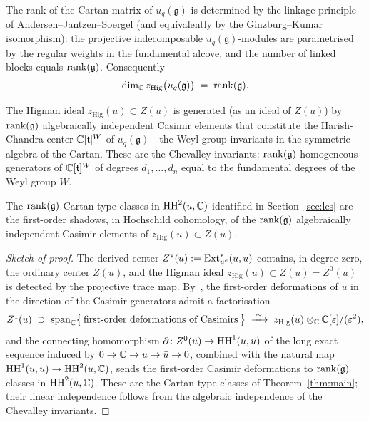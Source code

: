 The rank of the Cartan matrix of $u_q(\mathfrak{g})$ is determined by the linkage principle of Andersen--Jantzen--Soergel (and equivalently by the Ginzburg--Kumar isomorphism): the projective indecomposable $u_q(\mathfrak{g})$-modules are parametrised by the regular weights in the fundamental alcove, and the number of linked blocks equals $\operatorname{rank}(\mathfrak{g})$. Consequently
\begin{equation}
\label{eq:higdim}
\dim_{\mathbb{C}} z_{\mathrm{Hig}}\bigl(u_q(\mathfrak{g})\bigr) \;=\; \operatorname{rank}(\mathfrak{g}).
\end{equation}

The Higman ideal $z_{\mathrm{Hig}}(u) \subset Z(u)$ is generated (as an ideal of $Z(u)$) by $\operatorname{rank}(\mathfrak{g})$ algebraically independent Casimir elements that constitute the Harish-Chandra center $\mathbb{C}[\mathfrak{t}]^W$ of $u_q(\mathfrak{g})$---the Weyl-group invariants in the symmetric algebra of the Cartan. These are the Chevalley invariants: $\operatorname{rank}(\mathfrak{g})$ homogeneous generators of $\mathbb{C}[\mathfrak{t}]^W$ of degrees $d_1, \ldots, d_n$ equal to the fundamental degrees of the Weyl group $W$.

\begin{proposition}
\label{prop:casimir}
The $\operatorname{rank}(\mathfrak{g})$ Cartan-type classes in $\operatorname{HH}^2(u, \mathbb{C})$ identified in Section~\ref{sec:les} are the first-order shadows, in Hochschild cohomology, of the $\operatorname{rank}(\mathfrak{g})$ algebraically independent Casimir elements of $z_{\mathrm{Hig}}(u) \subset Z(u)$.
\end{proposition}

\begin{proof}[Sketch of proof]
The derived center $Z^*(u) := \operatorname{Ext}^*_{u^e}(u, u)$ contains, in degree zero, the ordinary center $Z(u)$, and the Higman ideal $z_{\mathrm{Hig}}(u) \subset Z(u) = Z^0(u)$ is detected by the projective trace map. By~\cite{LQ21}, the first-order deformations of $u$ in the direction of the Casimir generators admit a factorisation
\[
Z^1(u) \;\supset\; \operatorname{span}_{\mathbb{C}}\bigl\{\,\text{first-order deformations of Casimirs}\,\bigr\} \;\xrightarrow{\;\sim\;}\; z_{\mathrm{Hig}}(u) \otimes_{\mathbb{C}} \mathbb{C}[\varepsilon]/(\varepsilon^2),
\]
and the connecting homomorphism $\partial \colon Z^0(u) \to \operatorname{HH}^1(u, u)$ of the long exact sequence induced by $0 \to \mathbb{C} \to u \to \bar{u} \to 0$, combined with the natural map $\operatorname{HH}^1(u, u) \to \operatorname{HH}^2(u, \mathbb{C})$, sends the first-order Casimir deformations to $\operatorname{rank}(\mathfrak{g})$ classes in $\operatorname{HH}^2(u, \mathbb{C})$. These are the Cartan-type classes of Theorem~\ref{thm:main}; their linear independence follows from the algebraic independence of the Chevalley invariants.
\end{proof}

